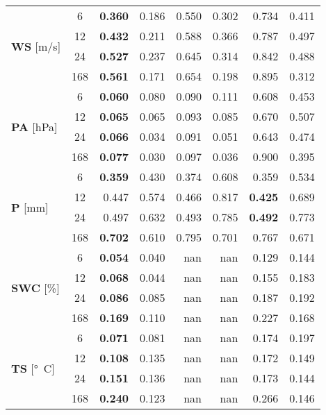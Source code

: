 \begin{table}
\begin{tabular}{p{2.1cm}c|rr|rr|rr}
\multirow[c]{4}{*}{\parbox{2.1cm}{\textbf{WS} [\si{m/s}]}} & 6 & \bfseries 0.360 & 0.186 & 0.550 & 0.302 & 0.734 & 0.411 \\
 & 12 & \bfseries 0.432 & 0.211 & 0.588 & 0.366 & 0.787 & 0.497 \\
 & 24 & \bfseries 0.527 & 0.237 & 0.645 & 0.314 & 0.842 & 0.488 \\
 & 168 & \bfseries 0.561 & 0.171 & 0.654 & 0.198 & 0.895 & 0.312 \\
\cline{1-8}
\multirow[c]{4}{*}{\parbox{2.1cm}{\textbf{PA} [\si{hPa}]}} & 6 & \bfseries 0.060 & 0.080 & 0.090 & 0.111 & 0.608 & 0.453 \\
 & 12 & \bfseries 0.065 & 0.065 & 0.093 & 0.085 & 0.670 & 0.507 \\
 & 24 & \bfseries 0.066 & 0.034 & 0.091 & 0.051 & 0.643 & 0.474 \\
 & 168 & \bfseries 0.077 & 0.030 & 0.097 & 0.036 & 0.900 & 0.395 \\
\cline{1-8}
\multirow[c]{4}{*}{\parbox{2.1cm}{\textbf{P} [\si{mm}]}} & 6 & \bfseries 0.359 & 0.430 & 0.374 & 0.608 & 0.359 & 0.534 \\
 & 12 & 0.447 & 0.574 & 0.466 & 0.817 & \bfseries 0.425 & 0.689 \\
 & 24 & 0.497 & 0.632 & 0.493 & 0.785 & \bfseries 0.492 & 0.773 \\
 & 168 & \bfseries 0.702 & 0.610 & 0.795 & 0.701 & 0.767 & 0.671 \\
\cline{1-8}
\multirow[c]{4}{*}{\parbox{2.1cm}{\textbf{SWC} [\si{\%}]}} & 6 & \bfseries 0.054 & 0.040 & nan & nan & 0.129 & 0.144 \\
 & 12 & \bfseries 0.068 & 0.044 & nan & nan & 0.155 & 0.183 \\
 & 24 & \bfseries 0.086 & 0.085 & nan & nan & 0.187 & 0.192 \\
 & 168 & \bfseries 0.169 & 0.110 & nan & nan & 0.227 & 0.168 \\
\cline{1-8}
\multirow[c]{4}{*}{\parbox{2.1cm}{\textbf{TS} [\si{°C}]}} & 6 & \bfseries 0.071 & 0.081 & nan & nan & 0.174 & 0.197 \\
 & 12 & \bfseries 0.108 & 0.135 & nan & nan & 0.172 & 0.149 \\
 & 24 & \bfseries 0.151 & 0.136 & nan & nan & 0.173 & 0.144 \\
 & 168 & \bfseries 0.240 & 0.123 & nan & nan & 0.266 & 0.146 \\
\cline{1-8}
\bottomrule
\end{tabular}
\end{table}

